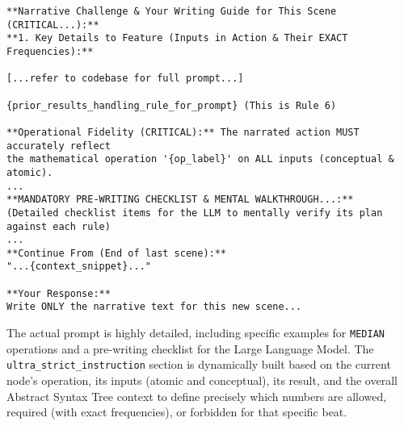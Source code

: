 \documentclass{article}
\begin{document}
\begin{verbatim}
**Narrative Challenge & Your Writing Guide for This Scene (CRITICAL...):**
**1. Key Details to Feature (Inputs in Action & Their EXACT Frequencies):**

[...refer to codebase for full prompt...]

{prior_results_handling_rule_for_prompt} (This is Rule 6)

**Operational Fidelity (CRITICAL):** The narrated action MUST accurately reflect
the mathematical operation '{op_label}' on ALL inputs (conceptual & atomic).
...
**MANDATORY PRE-WRITING CHECKLIST & MENTAL WALKTHROUGH...:**
(Detailed checklist items for the LLM to mentally verify its plan against each rule)
...
**Continue From (End of last scene):**
"...{context_snippet}..."

**Your Response:**
Write ONLY the narrative text for this new scene...
\end{verbatim}
The actual prompt is highly detailed, including specific examples for \texttt{MEDIAN} operations and a pre-writing checklist for the Large Language Model. The \texttt{ultra\_strict\_instruction} section is dynamically built based on the current node's operation, its inputs (atomic and conceptual), its result, and the overall Abstract Syntax Tree context to define precisely which numbers are allowed, required (with exact frequencies), or forbidden for that specific beat.
\end{document}
